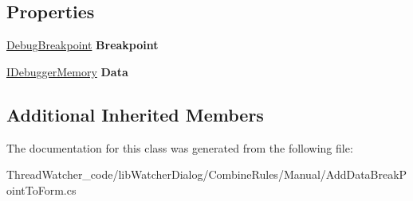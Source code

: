 \subsection*{Properties}
\begin{DoxyCompactItemize}
\item 
\hypertarget{classlib_watcher_dialog_1_1_combine_rules_1_1_add_data_break_point_to_form_ac8206395fbe4e29be9115ad9d6ffa7fc}{\hyperlink{classlib_wather_debugger_1_1_breakpoint_1_1_debug_breakpoint}{Debug\+Breakpoint} {\bfseries Breakpoint}}\label{classlib_watcher_dialog_1_1_combine_rules_1_1_add_data_break_point_to_form_ac8206395fbe4e29be9115ad9d6ffa7fc}

\item 
\hypertarget{classlib_watcher_dialog_1_1_combine_rules_1_1_add_data_break_point_to_form_a6cb7c16cd6c847a660ac4fc0cc1e8c84}{\hyperlink{interfacelib_utilities_1_1_i_debugger_memory}{I\+Debugger\+Memory} {\bfseries Data}}\label{classlib_watcher_dialog_1_1_combine_rules_1_1_add_data_break_point_to_form_a6cb7c16cd6c847a660ac4fc0cc1e8c84}

\end{DoxyCompactItemize}
\subsection*{Additional Inherited Members}


The documentation for this class was generated from the following file\+:\begin{DoxyCompactItemize}
\item 
Thread\+Watcher\+\_\+code/lib\+Watcher\+Dialog/\+Combine\+Rules/\+Manual/Add\+Data\+Break\+Point\+To\+Form.\+cs\end{DoxyCompactItemize}
